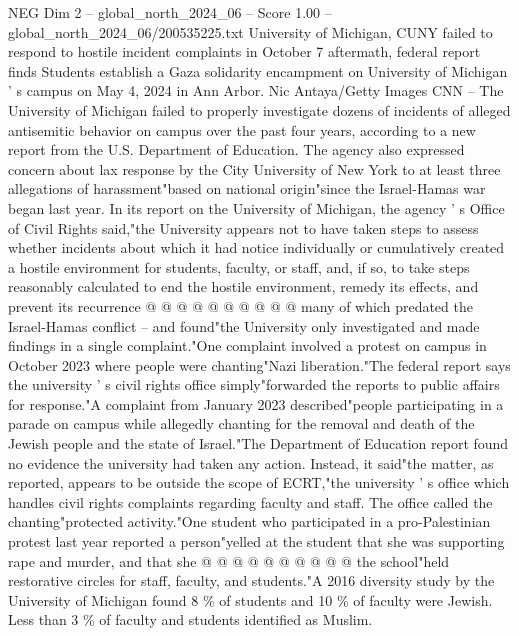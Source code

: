 \begin{textsample}{NEG Dim 2 – global\_north\_2024\_06 – Score 1.00 – global\_north\_2024\_06/200535225.txt}  \label{ex:f2_neg_191}
University of Michigan, CUNY failed to respond to hostile incident complaints in October 7 aftermath, federal report finds Students establish a Gaza solidarity encampment on University of Michigan ' s campus on May 4, 2024 in Ann Arbor.
Nic Antaya/Getty Images CNN -- The University of Michigan failed to properly investigate dozens of incidents of alleged antisemitic behavior on campus over the past four years, according to a new report from the U.S.
Department of Education.
The agency also expressed concern about lax response by the City University of New York to at least three allegations of harassment"based on national origin"since the Israel-Hamas war began last year.
In its report on the University of Michigan, the agency ' s Office of Civil Rights said,"the University appears not to have taken steps to assess whether incidents about which it had notice individually or cumulatively created a hostile environment for students, faculty, or staff, and, if so, to take steps reasonably calculated to end the hostile environment, remedy its effects, and prevent its recurrence @ @ @ @ @ @ @ @ @ @ many of which predated the Israel-Hamas conflict -- and found"the University only investigated and made findings in a single complaint."One complaint involved a protest on campus in October 2023 where people were chanting"Nazi liberation."The federal report says the university ' s civil rights office simply"forwarded the reports to public affairs for response."A complaint from January 2023 described"people participating in a parade on campus while allegedly chanting for the removal and death of the Jewish people and the state of Israel."The Department of Education report found no evidence the university had taken any action.
Instead, it said"the matter, as reported, appears to be outside the scope of ECRT,"the university ' s office which handles civil rights complaints regarding faculty and staff.
The office called the chanting"protected activity."One student who participated in a pro-Palestinian protest last year reported a person"yelled at the student that she was supporting rape and murder, and that she @ @ @ @ @ @ @ @ @ @ the school"held restorative circles for staff, faculty, and students."A 2016 diversity study by the University of Michigan found 8 \% of students and 10 \% of faculty were Jewish.
Less than 3 \% of faculty and students identified as Muslim.

\end{textsample}
